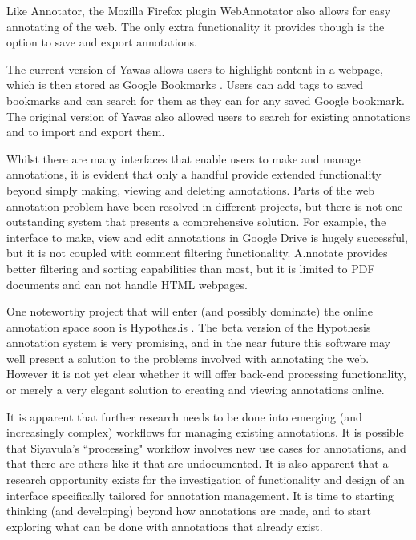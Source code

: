 Like Annotator, the Mozilla Firefox plugin WebAnnotator \citep{WebAnnotator1} \citep{WebAnnotator2} also allows for easy annotating of the web. The only extra functionality it provides though is the option to save and export annotations. 

The current version of Yawas \citep{YawasLink} allows users to highlight content in a webpage, which is then stored as Google Bookmarks \citep{GBookmarks}. Users can add tags to saved bookmarks and can search for them as they can for any saved Google bookmark. The original version of Yawas \citep{Yawas} also allowed users to search for existing annotations and to import and export them. 

Whilst there are many interfaces that enable users to make and manage annotations, it is evident that only a handful provide extended functionality beyond simply making, viewing and deleting annotations. Parts of the web annotation problem have been resolved in different projects, but there is not one outstanding system that presents a comprehensive solution. For example, the interface to make, view and edit annotations in Google Drive is hugely successful, but it is not coupled with comment filtering functionality. A.nnotate provides better filtering and sorting capabilities than most, but it is limited to PDF documents and can not handle HTML webpages. 

One noteworthy project that will enter (and possibly dominate) the online annotation space soon is Hypothes.is \citep{Hypothesis}. The beta version of the Hypothesis annotation system is very promising, and in the near future this software may well present a solution to the problems involved with annotating the web. However it is not yet clear whether it will offer back-end processing functionality, or merely a very elegant solution to creating and viewing annotations online.

It is apparent that further research needs to be done into emerging (and increasingly complex) workflows for managing existing annotations. It is possible that Siyavula's ``processing" workflow involves new use cases for annotations, and that there are others like it that are undocumented. It is also apparent that a research opportunity exists for the investigation of functionality and design of an interface specifically tailored for annotation management. It is time to starting thinking (and developing) beyond how annotations are made, and to start exploring what can be done with annotations that already exist. 